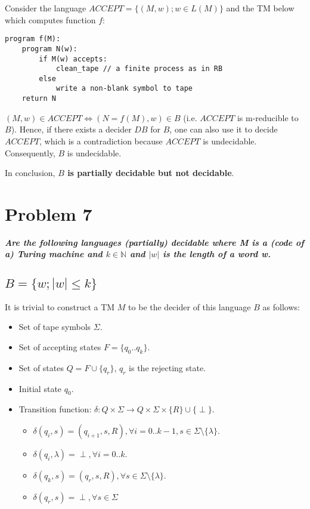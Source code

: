 \documentclass{article}
\begin{document}

Consider the language $ACCEPT=\{(M,w); w\in L(M)\}$ and the TM below which computes function $f$:

\begin{listing}[ht]
	\begin{verbatim}
program f(M):
    program N(w):
        if M(w) accepts:
            clean_tape // a finite process as in RB
        else
            write a non-blank symbol to tape
    return N
	\end{verbatim}
\end{listing}

$(M,w)\in ACCEPT \Leftrightarrow (N=f(M),w)\in B$ (i.e. $ACCEPT$ is m-reducible to $B$). Hence, if there exists a decider $DB$ for $B$, one can also use it to decide $ACCEPT$, which is a contradiction because $ACCEPT$ is undecidable. Consequently, $B$ is undecidable.

In conclusion, \textbf{$B$ is partially decidable but not decidable}.

\section{Problem 7}
\textbf{\textit{Are the following languages (partially) decidable where M is a (code of a) Turing machine and
$k \in \mathbb{N}$ and $|w|$ is the length of a word w.}}

\subsection{$B=\{w; |w| \le k\}$} \label{7.1}
It is trivial to construct a TM $M$ to be the decider of this language $B$ as follows:
\begin{itemize}
    \item Set of tape symbols $\Sigma$.
    \item Set of accepting states $F=\{q_0..q_k\}$.
    \item Set of states $Q=F \cup \{q_r\}$, $q_r$ is the rejecting state.
    \item Initial state $q_0$.
    \item Transition function: $\delta: Q \times \Sigma \to Q \times \Sigma \times \{R\} \cup \{\perp\}$.
    \begin{itemize}
        \item $\delta(q_i, s) = (q_{i+1}, s, R), \forall i=0..k-1,s\in\Sigma\setminus\{\lambda\}$.
        \item $\delta(q_i, \lambda) = \perp, \forall i=0..k$.
        \item $\delta(q_k, s) = (q_r, s, R), \forall s \in \Sigma\setminus\{\lambda\}$.
        \item $\delta(q_r, s) = \perp, \forall s \in \Sigma$
    \end{itemize}
\end{itemize}
\end{document}
